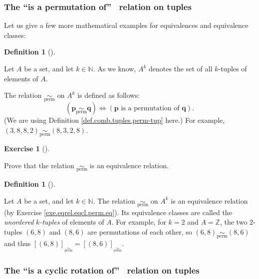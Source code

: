 \documentclass[numbers=enddot,12pt,final,onecolumn,notitlepage]{scrartcl}%
\newcounter{exer}
\numberwithin{exer}{subsection}
\theoremstyle{definition}
\newtheorem{defi}[theo]{Definition}
\newenvironment{definition}[1][]
{\begin{defi}[#1]\begin{leftbar}}
{\end{leftbar}\end{defi}}
\newtheorem{exmp}[exer]{Exercise}
\newenvironment{exercise}[1][]
{\begin{exmp}[#1]\begin{leftbar}}
{\end{leftbar}\end{exmp}}
\begin{document}
\subsubsection{The \textquotedblleft is a permutation of\textquotedblright%
\ relation on tuples}

Let us give a few more mathematical examples for equivalences and equivalence classes:

\begin{definition}
\label{def.eqrel.eqcl.perm}Let $A$ be a set, and let $k\in\mathbb{N}$. As we
know, $A^{k}$ denotes the set of all $k$-tuples of elements of $A$.

The relation $\underset{\operatorname*{perm}}{\sim}$ on $A^{k}$ is defined as
follows:%
\[
\left(  \mathbf{p}\underset{\operatorname*{perm}}{\sim}\mathbf{q}\right)
\Longleftrightarrow\left(  \mathbf{p}\text{ is a permutation of }%
\mathbf{q}\right)  .
\]
(We are using Definition \ref{def.comb.tuples.perm-tup} here.) For example,
$\left(  3,8,8,2\right)  \underset{\operatorname*{perm}}{\sim}\left(
8,3,2,8\right)  $.
\end{definition}

\begin{exercise}
\label{exe.eqrel.eqcl.perm.eq}Prove that the relation
$\underset{\operatorname*{perm}}{\sim}$ is an equivalence relation.
\end{exercise}

\begin{definition}
\label{def.eqrel.eqcl.perm.unord-tup}Let $A$ be a set, and let $k\in
\mathbb{N}$. The relation $\underset{\operatorname*{perm}}{\sim}$ on $A^{k}$
is an equivalence relation (by Exercise \ref{exe.eqrel.eqcl.perm.eq}). Its
equivalence classes are called the \textit{unordered }$k$\textit{-tuples} of
elements of $A$. For example, for $k=2$ and $A=\mathbb{Z}$, the two $2$-tuples
$\left(  6,8\right)  $ and $\left(  8,6\right)  $ are permutations of each
other, so $\left(  6,8\right)  \underset{\operatorname*{perm}}{\sim}\left(
8,6\right)  $ and thus $\left[  \left(  6,8\right)  \right]
_{\underset{\operatorname*{perm}}{\sim}}=\left[  \left(  8,6\right)  \right]
_{\underset{\operatorname*{perm}}{\sim}}$.
\end{definition}

\subsubsection{The \textquotedblleft is a cyclic rotation of\textquotedblright%
\ relation on tuples}
\end{document}
